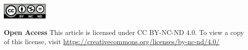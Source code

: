 \vspace{8mm}
\noindent
\includegraphics[height=8mm]{licenses/by-nc-nd}
\vspace{2mm}
\begin{spacing}{.6}
\noindent
\textbf{Open Access} This article is licensed under CC BY-NC-ND 4.0. To view a copy of this license, visit \url{https://creativecommons.org/licenses/by-nc-nd/4.0/}
\end{spacing}